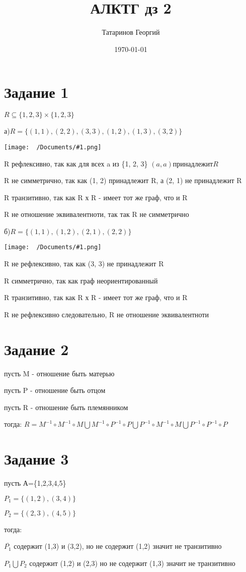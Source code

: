 \documentclass[a4paper, 12pt]{article}
\title{АЛКТГ дз 2}
\author{Татаринов Георгий}
\date{\today}
\newcommand{\n}{\par{}}
\renewcommand{\d}{$}
\renewcommand{\u}{\bigcup{}}
\newcommand{\png}[1]{\texttt{[image: ~/Documents/\#1.png]}\n}
\renewcommand{\i}{^{-1}}
\begin{document}
	\maketitle
	\section*{Задание 1}
		$R \subseteq \{1, 2, 3\} \times \{1, 2, 3\}$\n
		а)$R = \{(1, 1), (2, 2), (3, 3), (1, 2), (1, 3), (3, 2)\}$\n
		\png{1}
		R рефлексивно, так как для всех a из \{1, 2, 3\} $(a, a) принадлежит R$

		R не симметрично, так как (1, 2) принадлежит R, а (2, 1) не принадлежит R

		R транзитивно, так как R х R - имеет тот же граф, что и R

		R не отношение эквивалентноти, так так R не симметрично


		б)$R = \{(1, 1), (1, 2), (2, 1), (2, 2)\}$

		\png{2}

		R не рефлексивно, так как (3, 3) не принадлежит R

		R симметрично, так как граф неориентированный

		R транзитивно, так как R х R - имеет тот же граф, что и R

		R не рефлексивно следовательно, R не отношение эквивалентноти

	\section*{Задание 2}
		пусть M - отношение быть матерью
		
		пусть P - отношение быть отцом

		пусть R - отношение быть племянником

		тогда: \d R=M \i \circ M \i \circ M \u M \i \circ P \i \circ P \u P \i \circ M \i \circ M \u P \i \circ P \i \circ P \d
	\section*{Задание 3}
		пусть А=\{1,2,3,4,5\}

		$P_1=\{(1,2),(3,4)\}$

		$P_2=\{(2,3),(4,5)\}$

		тогда:

		$\overline{P_1}$ содержит (1,3) и (3,2), но не содержит (1,2) значит не транзитивно

		$P_1\u P_2$ содержит (1,2) и (2,3) но не содержит (1,3) значит не транзитивно
\end{document}
